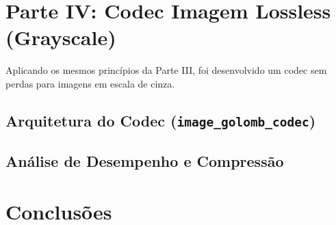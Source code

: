 \documentclass[a4paper, 11pt, portuguese]{article}
\begin{document}
\section{Parte IV: Codec Imagem Lossless (Grayscale)}

Aplicando os mesmos princípios da Parte III, foi desenvolvido um codec sem perdas para imagens em escala de cinza.

\subsection{Arquitetura do Codec (\texttt{image\_golomb\_codec})}


\subsection{Análise de Desempenho e Compressão}



\section{Conclusões}



%
\end{document}

